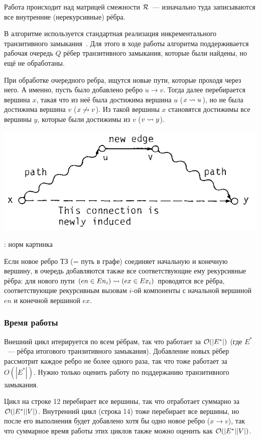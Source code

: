 Работа происходит над матрицей смежности $\mathcal{R}$~--- изначально туда записываются все внутренние (нерекурсивные) рёбра. 

В алгоритме используется стандартная реализация инкрементального транзитивного замыкания~\cite{Ibaraki1983}. Для этого в ходе работы алгоритма поддерживается рабочая очередь $Q$ рёбер транзитивного замыкания, которые были найдены, но ещё не обработаны. 

При обработке очередного ребра, ищутся новые пути, которые проходя через него. А именно, пусть было добавлено ребро $u \to v$. Тогда далее перебирается вершина $x$, такая что из неё была достижима вершина $u$ ($x \rightsquigarrow u$), но не была достижима вершина $v$ ($x \not\rightsquigarrow v$). Из такой вершины $x$ становятся достижимы все вершины $y$, которые были достижимы из $v$ ($v \rightsquigarrow y$).

\includegraphics[width=0.75\linewidth]{img/TC_add}

\TODO: норм картинка

Если новое ребро ТЗ (= путь в графе) соединяет начальную и конечную вершину, в очередь добавляются также все соответствующие ему рекурсивные рёбра: для нового пути $(en \in En_i) \rightsquigarrow (ex \in Ex_i)$ проводятся все рёбра, соответствующие рекурсивным вызовам $i$-ой компоненты с начальной вершиной $en$ и конечной вершиной $ex$.

\subsubsection*{Время работы}

Внешний цикл итерируется по всем рёбрам, так что работает за $\mathcal{O}(|E^{*}|)$ (где $E^{*}$~--- рёбра итогового транзитивного замыкания). Добавление новых рёбер рассмотрит каждое ребро не более одного раза, так что тоже работает за $O(|E^{*}|)$. Нужно только оценить работу по поддержанию транзитивного замыкания. 

Цикл на строке 12 перебирает все вершины, так что отработает суммарно за $\mathcal{O}(|E^{*}| |V|)$. Внутренний цикл (строка 14) тоже перебирает все вершины, но после его выполнения будет добавлено хотя бы одно новое ребро ($x \to v$), так что суммарное время работы этих циклов также можно оценить как $\mathcal{O}(|E^{*}| |V|)$.

